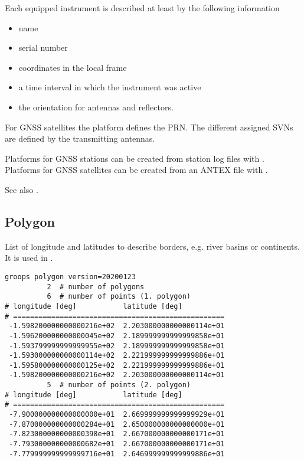 Each equipped instrument is described at least by the following information
\begin{itemize}
\item name
\item serial number
\item coordinates in the local frame
\item a time interval in which the instrument was active
\item the orientation for antennas and reflectors.
\end{itemize}

For GNSS satellites the platform defines the PRN. The different assigned SVNs
are defined by the transmitting antennas.

Platforms for GNSS stations can be created from station log files with
. Platforms for GNSS satellites
can be created from an ANTEX file with .

See also .



\subsection{Polygon}\label{general.fileFormat:polygon}
List of longitude and latitudes to describe borders, e.g. river basins or continents.
It is used in .

\begin{verbatim}
groops polygon version=20200123
          2  # number of polygons
          6  # number of points (1. polygon)
# longitude [deg]           latitude [deg]
# ==================================================
 -1.598200000000000216e+02  2.203000000000000114e+01
 -1.596200000000000045e+02  2.189999999999999858e+01
 -1.593799999999999955e+02  2.189999999999999858e+01
 -1.593000000000000114e+02  2.221999999999999886e+01
 -1.595800000000000125e+02  2.221999999999999886e+01
 -1.598200000000000216e+02  2.203000000000000114e+01
          5  # number of points (2. polygon)
# longitude [deg]           latitude [deg]
# ==================================================
 -7.900000000000000000e+01  2.669999999999999929e+01
 -7.870000000000000284e+01  2.650000000000000000e+01
 -7.823000000000000398e+01  2.667000000000000171e+01
 -7.793000000000000682e+01  2.667000000000000171e+01
 -7.779999999999999716e+01  2.646999999999999886e+01
\end{verbatim}



